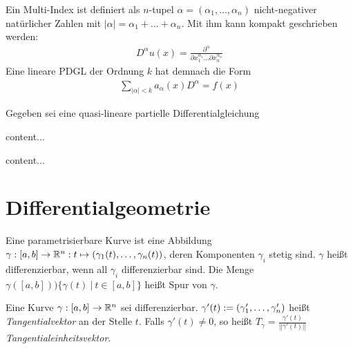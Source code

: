 \begin{definition}
	Ein Multi-Index ist definiert als $n$-tupel $\alpha = (\alpha_1,...,\alpha_n)$ nicht-negativer natürlicher Zahlen mit $|\alpha| = \alpha_1 + ... + \alpha_n$. Mit ihm kann kompakt geschrieben werden:
	\begin{align*}
		D^\alpha u (x) = \frac{\partial^\alpha}{\partial x_1^{\alpha_1} ... \partial x_n^{\alpha_n}}
	\end{align*}
	Eine lineare PDGL der Ordnung $k$ hat demnach die Form
	\begin{align*}
		\sum_{|\alpha| < k} a_\alpha (x) D^\alpha = f(x)
	\end{align*}
\end{definition}


\begin{satz}
	Gegeben sei eine quasi-lineare partielle Differentialgleichung
\end{satz}


\begin{satz}
	content...
\end{satz}

\begin{satz}
	content...
\end{satz}


\pagebreak

\section{Differentialgeometrie}


\begin{definition}
	Eine parametrisierbare Kurve ist eine Abbildung $\gamma : [a, b] \rightarrow \mathbb{R}^n : t \mapsto (\gamma_1(t), \dots, \gamma_n(t))$, deren Komponenten $\gamma_i$ stetig sind. $\gamma$ heißt differenzierbar, wenn all $\gamma_i$ differenzierbar sind. Die Menge $\gamma([a,b]) ) \{\gamma(t) \medspace | \medspace t \in [a,b] \}$ heißt Spur von $\gamma$.
\end{definition}

\begin{definition}[Tangentialvektor]
	Eine Kurve $\gamma : [a,b] \rightarrow \mathbb{R}^n$ sei differenzierbar. $\gamma'(t) := (\gamma'_1, \dots, \gamma'_n)$ heißt \emph{Tangentialvektor} an der Stelle $t$. Falls $\gamma'(t) \neq 0$, so heißt $T_\gamma = \frac{\gamma'(t)}{||\gamma'(t)||}$ \emph{Tangentialeinheitsvektor}.
\end{definition}

